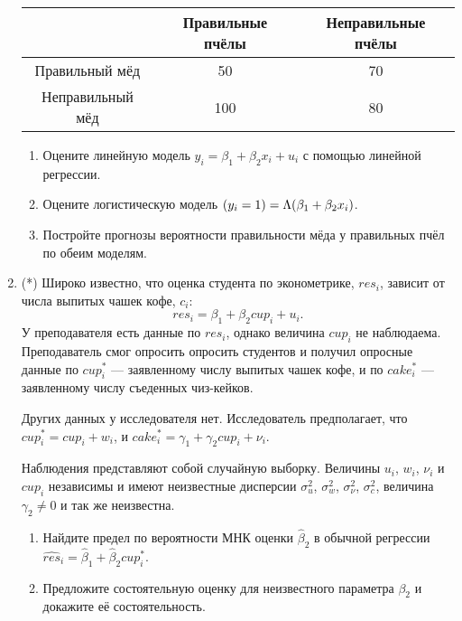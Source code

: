 \documentclass[12pt]{article}
\let\P\relax
\DeclareMathOperator{\P}{\mathbb{P}}
\begin{document}
\begin{enumerate}
    \begin{tabular}{ccc}
        \toprule 
         & Правильные пчёлы & Неправильные пчёлы \\
        \midrule
        Правильный мёд & 50 & 70 \\
        Неправильный мёд & 100 & 80 \\
        \bottomrule
    \end{tabular}
    
    \begin{enumerate}
        \item Оцените линейную модель $y_i = \beta_1 + \beta_2 x_i + u_i$ с помощью линейной регрессии. 
        \item Оцените логистическую модель $\P(y_i = 1) = \Lambda(\beta_1 + \beta_2 x_i)$. 
        \item Постройте прогнозы вероятности правильности мёда у правильных пчёл по обеим моделям. 
    \end{enumerate}

\item (*) Широко известно, что оценка студента по эконометрике, $res_i$, зависит от числа выпитых чашек кофе, $c_i$:
\[
res_i = \beta_1 + \beta_2 cup_i + u_i.
\]
У преподавателя есть данные по $res_i$, однако величина $cup_i$ не наблюдаема. 
Преподаватель смог опросить опросить студентов и получил опросные данные по $cup_i^*$ —
заявленному числу выпитых чашек кофе, и по $cake_i^*$ — заявленному числу съеденных чиз-кейков. 

Других данных у исследователя нет. Исследователь предполагает, что $cup_i^* = cup_i + w_i$, и
$cake_i^* = \gamma_1 + \gamma_2 cup_i + \nu_i$. 


Наблюдения представляют собой случайную выборку. 
Величины $u_i$, $w_i$, $\nu_i$ и $cup_i$ независимы и имеют неизвестные дисперсии $\sigma^2_u$, $\sigma^2_w$,
$\sigma^2_{\nu}$, $\sigma^2_c$, величина $\gamma_2 \neq 0$ и так же неизвестна. 



\begin{enumerate}
    \item Найдите предел по вероятности МНК оценки $\hat\beta_2$ 
    в обычной регрессии $\widehat{res}_i = \hat\beta_1 + \hat\beta_2 cup_i^*$. 

    \item Предложите состоятельную оценку для неизвестного параметра $\beta_2$ и докажите её состоятельность. 
\end{enumerate}


\end{enumerate}
\end{document}
